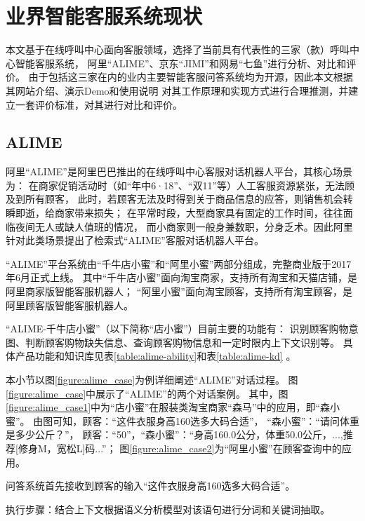 \section{业界智能客服系统现状}
\label{section:peer-system}

本文基于在线呼叫中心面向客服领域，选择了当前具有代表性的三家（款）呼叫中心智能客服系统，
阿里“ALIME”、京东“JIMI”和网易“七鱼”进行分析、对比和评价。
由于包括这三家在内的业内主要智能客服问答系统均为开源，因此本文根据其网站介绍、演示Demo和使用说明
对其工作原理和实现方式进行合理推测，并建立一套评价标准，对其进行对比和评价。

\subsection{ALIME}
\label{subsection:alime}
阿里“ALIME”是阿里巴巴推出的在线呼叫中心客服对话机器人平台，其核心场景为：
在商家促销活动时（如“年中6·18”、“双11”等）人工客服资源紧张，无法顾及到所有顾客，
此时，若顾客无法及时得到关于商品信息的应答，则销售机会转瞬即逝，给商家带来损失；
在平常时段，大型商家具有固定的工作时间，往往面临夜间无人或缺人值班的情况，
而小商家则一般身兼数职，分身乏术。因此阿里针对此类场景提出了检索式“ALIME”客服对话机器人平台。

“ALIME”平台系统由“千牛店小蜜”和“阿里小蜜”两部分组成，完整商业版于2017年6月正式上线。
其中“千牛店小蜜”面向淘宝商家，支持所有淘宝和天猫店铺，是阿里商家版智能客服机器人；
“阿里小蜜”面向淘宝顾客，支持所有淘宝顾客，是阿里顾客版智能客服机器人。

“ALIME-千牛店小蜜”（以下简称“店小蜜”）目前主要的功能有：
识别顾客购物意图、判断顾客购物缺失信息、查询顾客购物信息和一定时限内上下文识别等。
具体产品功能和知识库见表\ref{table:alime-ability}和表\ref{table:alime-kd}
。


本小节以图\ref{figure:alime_case}为例详细阐述“ALIME”对话过程。
图\ref{figure:alime_case}中展示了“ALIME”的两个对话案例。
其中，图\ref{figure:alime_case1}中为“店小蜜”在服装类淘宝商家“森马”中的应用，即“森小蜜”。
由图可知，顾客：“这件衣服身高160选多大码合适”，
“森小蜜”：“请问体重是多少公斤？”，
顾客：“50”，“森小蜜”：“身高160.0公分，体重50.0公斤，...,推荐[修身M，宽松L]码...”；
图\ref{figure:alime_case2}为“阿里小蜜”在顾客查询中的应用。


\textbullet{}问答系统首先接收到顾客的输入“这件衣服身高160选多大码合适”。

执行步骤：结合上下文根据语义分析模型对该语句进行分词和关键词抽取。

